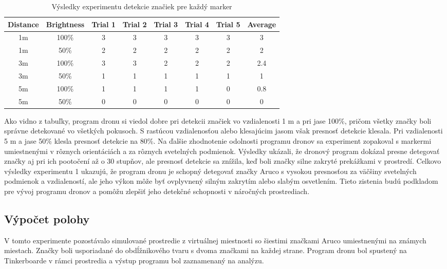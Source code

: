 \begin{table}[h!] 
    \centering
        \begin{tabular}{|c c | c c c c c | c|} 
        \hline
        Distance & Brightness & Trial 1 & Trial 2 & Trial 3 &  Trial 4 &  Trial 5 &  Average \\ [0.5ex] 
        \hline\hline
        1m & 100\% & 3 & 3 & 3 & 3 & 3 & 3\\ 
        \hline
        1m & 50\% & 2 & 2 & 2 & 2 & 2 & 2\\
        \hline
        3m & 100\% & 3 & 3 & 2 & 2 & 2 & 2.4\\
        \hline
        3m & 50\% & 1 & 1 & 1 & 1 & 1 & 1\\
        \hline
        5m & 100\% & 1 & 1 & 1 & 1 & 0 & 0.8\\
        \hline
        5m & 50\% & 0 & 0 & 0 & 0 & 0 & 0\\ [1ex] 
        \hline
       \end{tabular}
       \caption{Výsledky experimentu detekcie značiek pre každý marker}
        \label{table:1}
\end{table}
Ako vidno z tabuľky, program dronu si viedol dobre pri detekcii značiek vo vzdialenosti 1 m a pri jase 100\%, pričom všetky značky boli správne detekované vo všetkých pokusoch. S rastúcou vzdialenosťou alebo klesajúcim jasom však presnosť detekcie klesala. Pri vzdialenosti 5 m a jase 50\% klesla presnosť detekcie na 80\%.
Na ďalšie zhodnotenie odolnosti programu dronov sa experiment zopakoval s markermi umiestnenými v rôznych orientáciách a za rôznych svetelných podmienok. Výsledky ukázali, že dronový program dokázal presne detegovať značky aj pri ich pootočení až o 30 stupňov, ale presnosť detekcie sa znížila, keď boli značky silne zakryté prekážkami v prostredí.
Celkovo výsledky experimentu 1 ukazujú, že program dronu je schopný detegovať značky Aruco s vysokou presnosťou za väčšiny svetelných podmienok a vzdialeností, ale jeho výkon môže byť ovplyvnený silným zakrytím alebo slabým osvetlením. Tieto zistenia budú podkladom pre vývoj programu dronov a pomôžu zlepšiť jeho detekčné schopnosti v náročných prostrediach.

\subsection{Výpočet polohy}
V tomto experimente pozostávalo simulované prostredie z virtuálnej miestnosti so šiestimi značkami Aruco umiestnenými na známych miestach. Značky boli usporiadané do obdĺžnikového tvaru s dvoma značkami na každej strane. Program dronu bol spustený na Tinkerboarde v rámci prostredia a výstup programu bol zaznamenaný na analýzu.
 
